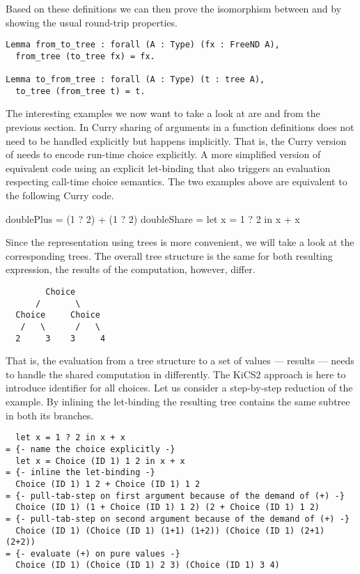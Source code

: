 Based on these definitions we can then prove the isomorphism between  and  by showing the usual round-trip properties.

\begin{verbatim}
Lemma from_to_tree : forall (A : Type) (fx : FreeND A),
  from_tree (to_tree fx) = fx.

Lemma to_from_tree : forall (A : Type) (t : tree A),
  to_tree (from_tree t) = t.
\end{verbatim}

The interesting examples we now want to take a look at are  and  from the
previous section.
In Curry sharing of arguments in a function definitions does not need to be handled explicitly but happens implicitly.
That is, the Curry version of  needs to encode run-time choice explicitly.
A more simplified version of equivalent code using an explicit let-binding that also triggers an evaluation respecting call-time
choice semantics.
The two examples above are equivalent to the following Curry code.

\begin{curry}
doublePlus = (1 ? 2) + (1 ? 2)
doubleShare = let x = 1 ? 2 in x + x
\end{curry}

Since the representation using trees is more convenient, we will take a look at the corresponding trees.
The overall tree structure is the same for both resulting expression, the results of the computation, however, differ.

\begin{verbatim}
        Choice
      /       \
  Choice     Choice
   /   \      /   \
  2     3    3     4
\end{verbatim}

That is, the evaluation from a tree structure to a set of values --- results --- needs to handle the shared computation in  differently.
The KiCS2 approach is here to introduce identifier for all choices.
Let us consider a step-by-step reduction of the \cyinl{doubleShare} example.
By inlining the let-binding the resulting tree contains the same subtree in both its branches.

\begin{verbatim}
  let x = 1 ? 2 in x + x
= {- name the choice explicitly -}
  let x = Choice (ID 1) 1 2 in x + x
= {- inline the let-binding -}
  Choice (ID 1) 1 2 + Choice (ID 1) 1 2
= {- pull-tab-step on first argument because of the demand of (+) -}
  Choice (ID 1) (1 + Choice (ID 1) 1 2) (2 + Choice (ID 1) 1 2)
= {- pull-tab-step on second argument because of the demand of (+) -}
  Choice (ID 1) (Choice (ID 1) (1+1) (1+2)) (Choice (ID 1) (2+1) (2+2))
= {- evaluate (+) on pure values -}
  Choice (ID 1) (Choice (ID 1) 2 3) (Choice (ID 1) 3 4)
\end{verbatim}

